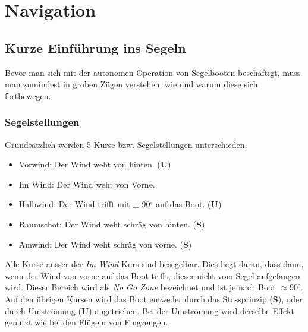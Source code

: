 \chapter{Navigation}
\label{chap:autonomie}
\section{Kurze Einführung ins Segeln}
Bevor man sich mit der autonomen Operation von Segelbooten beschäftigt, muss man zumindest in groben Zügen verstehen, wie und warum diese sich fortbewegen.
\subsection{Segelstellungen}
Grundsätzlich werden 5 Kurse bzw. Segelstellungen unterschieden.
\begin{itemize}
    \item Vorwind: Der Wind weht von hinten. (\textbf{U})
    \item Im Wind: Der Wind weht von Vorne.
    \item Halbwind: Der Wind trifft mit  $\pm$ 90$^{\circ}$ auf das Boot. (\textbf{U})
    \item Raumschot: Der Wind weht schräg von hinten. (\textbf{S})
    \item Amwind: Der Wind weht schräg von vorne. (\textbf{S})
\end{itemize}
Alle Kurse ausser der \textit{Im Wind} Kurs sind besegelbar. Dies liegt daran, dass dann, wenn der Wind von vorne auf das Boot trifft, dieser nicht vom Segel aufgefangen wird. Dieser Bereich wird als \textit{No Go Zone} bezeichnet und ist je nach Boot $\approx 90^{\circ}$. Auf den übrigen Kursen wird das Boot entweder durch das Stossprinzip (\textbf{S}), oder durch Umströmung (\textbf{U}) angetrieben. Bei der Umströmung wird derselbe Effekt genutzt wie bei den Flügeln von Flugzeugen. 
